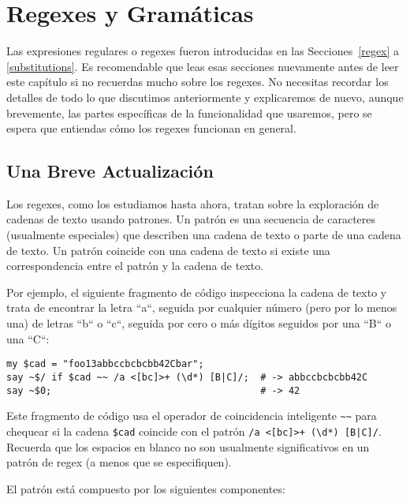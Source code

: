 


\chapter{Regexes y Gramáticas}
\label{regex_grammars}

Las expresiones regulares o regexes fueron introducidas en las
Secciones~\ref{regex} a \ref{substitutions}. Es recomendable que leas
esas secciones nuevamente antes de leer este capítulo si no 
recuerdas mucho sobre los regexes. No necesitas recordar los detalles
de todo lo que discutimos anteriormente y explicaremos de nuevo, aunque
brevemente, las partes específicas de la funcionalidad que usaremos,
pero se espera que entiendas cómo los regexes funcionan en general.

\section{Una Breve Actualización}

Los regexes, como los estudiamos hasta ahora, tratan sobre
la exploración de cadenas de texto usando patrones. 
Un patrón es una secuencia de caracteres (usualmente especiales)
que describen una cadena de texto o parte de una 
cadena de texto. Un patrón coincide con una cadena de texto si existe
una correspondencia entre el patrón y la cadena de texto.

Por ejemplo, el siguiente fragmento de código inspecciona la 
cadena de texto y trata de encontrar la letra ``a``, seguida por 
cualquier número (pero por lo menos una) de letras ``b`` o ``c``,
seguida por cero o más dígitos seguidos por una ``B`` o una ``C``:

\begin{verbatim}
my $cad = "foo13abbccbcbcbb42Cbar";
say ~$/ if $cad ~~ /a <[bc]>+ (\d*) [B|C]/;  # -> abbccbcbcbb42C
say ~$0;                                     # -> 42
\end{verbatim}

Este fragmento de código usa el operador de coincidencia 
inteligente \verb|~~| para chequear si la cadena \verb|$cad|
coincide con el patrón \verb'/a <[bc]>+ (\d*) [B|C]/'. Recuerda
que los espacios en blanco no son usualmente significativos en 
un patrón de regex (a menos que se especifiquen).

El patrón está compuesto por los siguientes componentes:

